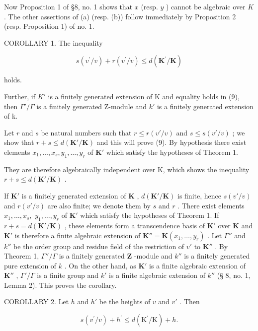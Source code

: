 Now Proposition 1 of §8, no. 1 shows that \(x\) (resp. \(y\) ) cannot be algebraic over \(K\) . The other assertions of (a) (resp. (b)) follow immediately by Proposition 2 (resp. Proposition 1) of no. 1.

COROLLARY 1. The inequality

\[
s (v ^ {\prime} / v) + r (v ^ {\prime} / v) \leqslant d (\mathbf {K} ^ {\prime} / \mathbf {K})\tag{9}
\]

holds.

Further, if \(K'\) is a finitely generated extension of K and equality holds in (9), then \(\Gamma'/\Gamma\) is a finitely generated Z-module and \(k'\) is a finitely generated extension of k.

Let \(r\) and \(s\) be natural numbers such that \(r \leqslant r(v'/v)\) and \(s \leqslant s(v'/v)\) ; we show that \(r + s \leqslant d(\mathbf{K}'/\mathbf{K})\) and this will prove (9). By hypothesis there exist elements \(x_1, \ldots, x_s, y_1, \ldots, y_r\) of \(\mathbf{K}'\) which satisfy the hypotheses of Theorem 1.

They are therefore algebraically independent over K, which shows the inequality \(r + s \leqslant d(\mathbf{K}'/\mathbf{K})\) .

If \(\mathbf{K}'\) is a finitely generated extension of \(\mathbf{K}\) , \(d(\mathbf{K}' / \mathbf{K})\) is finite, hence \(s(v' / v)\) and \(r(v' / v)\) are also finite; we denote them by \(s\) and \(r\) . There exist elements \(x_{1},\ldots ,x_{s},\) \(y_{1},\ldots ,y_{r}\) of \(\mathbf{K}'\) which satisfy the hypotheses of Theorem 1. If \(r + s = d(\mathbf{K}' / \mathbf{K})\) , these elements form a transcendence basis of \(\mathbf{K}'\) over \(\mathbf{K}\) and \(\mathbf{K}'\) is therefore a finite algebraic extension of \(\mathbf{K}'' = \mathbf{K}(x_1,\dots,y_r)\) . Let \(\Gamma''\) and \(k''\) be the order group and residue field of the restriction of \(v'\) to \(\mathbf{K}''\) . By Theorem 1, \(\Gamma'' / \Gamma\) is a finitely generated \(\mathbf{Z}\) -module and \(k''\) is a finitely generated pure extension of \(k\) . On the other hand, as \(\mathbf{K}'\) is a finite algebraic extension of \(\mathbf{K}''\) , \(\Gamma' / \Gamma\) is a finite group and \(k'\) is a finite algebraic extension of \(k''\) (§ 8, no. 1, Lemma 2). This proves the corollary.

COROLLARY 2. Let \(h\) and \(h'\) be the heights of \(v\) and \(v'\) . Then

\[
s (v ^ {\prime} / v) + h ^ {\prime} \leqslant d (\mathrm{K} ^ {\prime} / \mathrm{K}) + h.\tag{10}
\]

